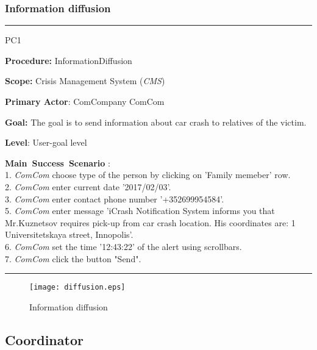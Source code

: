 \subsubsection{Information diffusion}
\vspace{0.5cm}
\hrule
\begin{lyxlist}{PC1}
\small{
\item [\textbf{Procedure:}] InformationDiffusion
\item [\textbf{Scope:}]  Crisis Management System (\emph{CMS})
\item [\textbf{Primary Actor}:] ComCompany ComCom
\item [\textbf{Goal:}] The goal is to send information about car crash to
relatives of the victim.
\item [\textbf{Level}:] User-goal level
\item [\textbf{Main~Success~Scenario}]:\\
1. \emph{ComCom} choose type of the person by clicking on 'Family memeber' row.
\\
2. \emph{ComCom} enter current date '2017/02/03'. \\
3. \emph{ComCom} enter contact phone number '+352699954584'. \\
5. \emph{ComCom} enter message 'iCrash Notification System informs you that
Mr.Kuznetsov requires pick-up from car crash location. His coordinates are:
1 Universitetskaya street, Innopolis'.\\
6. \emph{ComCom} set the time '12:43:22' of the alert using scrollbars.\\
7. \emph{ComCom} click the button "Send".\\
}
\end{lyxlist}
\hrule
\vspace{0.5cm}

\begin{figure}[h]
    \texttt{[image: diffusion.eps]}
	\caption{Information diffusion}
\end{figure}

\subsection{Coordinator}

